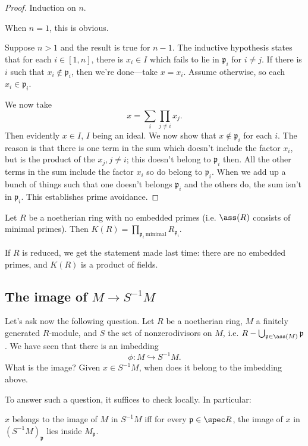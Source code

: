 \begin{proof} 
Induction on $n$.

When $n=1$, this is obvious.

Suppose $n>1$ and the result is true for $n-1$. The inductive hypothesis states
that for each $i \in [1, n]$, there is $x_i \in I$ which fails to lie in
$\mathfrak{p}_i$ for $i \neq j$. 
If there is $i$ such that $x_i \notin \mathfrak{p}_i$, then we're done---take
$x = x_i$. Assume otherwise, so each $x_i \in \mathfrak{p}_i$.

We now take
\[  x = \sum_i \prod_{j \neq i} x_j.  \]
Then evidently $x \in I$, $I$ being an ideal. We now show that $x \notin
\mathfrak{p}_i$ for each $i$. The reason is that there is one term in the sum
which doesn't include the factor $x_i$, but is the product of the $x_j, j \neq
i$; this doesn't belong to $\mathfrak{p}_i$ then. All the other terms in the
sum include the factor $x_i$ so do belong to $\mathfrak{p}_i$. When we add up a
bunch of things such that one doesn't belongs  $\mathfrak{p}_i$ and the others
do, the sum isn't in $\mathfrak{p}_i$. This establishes prime avoidance.
\end{proof} 

\begin{corollary} 
Let $R$ be a noetherian ring with no embedded primes (i.e. $\ass(R)$ consists
of minimal primes).
Then $K(R) = \prod_{\mathfrak{p}_i \ \mathrm{minimal}} R_{\mathfrak{p_i}}$.
\end{corollary} 
If $R$ is reduced, we get the statement made last time: there are no
embedded primes, and $K(R)$ is a product of
fields. 

\subsection{The image of $M \to S^{-1}M$}
Let's ask now the following question. Let $R$ be a noetherian ring, $M$ a finitely generated
$R$-module, and $S$ the set of nonzerodivisors on $M$, i.e. $R -
\bigcup_{\mathfrak{p} \in \ass(M)} \mathfrak{p}$. We have seen that there is an
imbedding
\[ \phi: M \hookrightarrow S^{-1}M.  \]
What is the image? Given $x \in S^{-1}M$, when does it belong to the imbedding
above.

To answer such a question, it suffices to check locally. In particular:
\begin{proposition} 
$x$ belongs to the image of $M $ in $S^{-1}M$ iff for every $\mathfrak{p} \in
\spec R$, the image of $x$ in $(S^{-1}M)_{\mathfrak{p}}$ lies inside
$M_{\mathfrak{p}}$. 
\end{proposition} 


